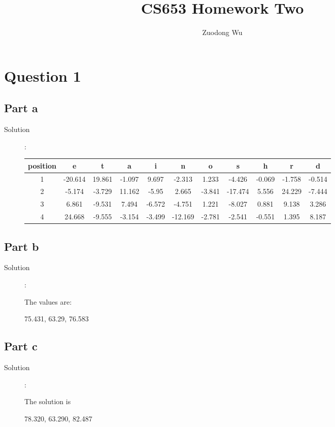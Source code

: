\documentclass[a4paper,11pt]{article}
\begin{document}
\author{Zuodong Wu}
\title{CS653 Homework Two}
\maketitle
\section{Question 1}
\subsection{Part a}
\begin{description}
  \item [Solution]:

\begin{tabular}{ c|c|c|c|c|c|c|c|c|c|c }
  position & e & t & a & i & n & o & s & h & r & d \\ \hline
 1& -20.614& 19.861& -1.097& 9.697& -2.313& 1.233& -4.426& -0.069& -1.758& -0.514 \\
 2& -5.174& -3.729& 11.162& -5.95& 2.665& -3.841& -17.474& 5.556& 24.229& -7.444 \\
  3& 6.861& -9.531& 7.494& -6.572& -4.751& 1.221& -8.027& 0.881& 9.138& 3.286 \\
  4& 24.668& -9.555& -3.154& -3.499& -12.169& -2.781& -2.541& -0.551& 1.395& 8.187
\end{tabular}

\end{description}
\subsection{Part b}
\begin{description}
  \item [Solution]: 

The values are:
\begin{center}
75.431, 63.29, 76.583
\end{center}

\end{description}
\subsection{Part c}
\begin{description}
  \item [Solution]: 

The solution is
\begin{center}
78.320,  63.290, 82.487
\end{center}

\end{description}
\end{document}
